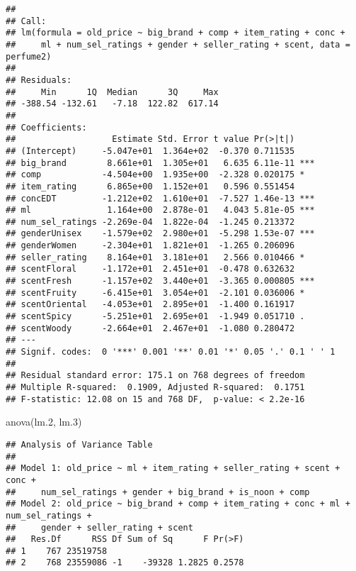 \documentclass[
]{article}
\newenvironment{Shaded}{\begin{snugshade}}{\end{snugshade}}
\newcommand{\FloatTok}[1]{\textcolor[rgb]{0.00,0.00,0.81}{#1}}
\newcommand{\FunctionTok}[1]{\textcolor[rgb]{0.00,0.00,0.00}{#1}}
\newcommand{\NormalTok}[1]{#1}
\begin{document}
\begin{verbatim}
## 
## Call:
## lm(formula = old_price ~ big_brand + comp + item_rating + conc + 
##     ml + num_sel_ratings + gender + seller_rating + scent, data = perfume2)
## 
## Residuals:
##     Min      1Q  Median      3Q     Max 
## -388.54 -132.61   -7.18  122.82  617.14 
## 
## Coefficients:
##                   Estimate Std. Error t value Pr(>|t|)    
## (Intercept)     -5.047e+01  1.364e+02  -0.370 0.711535    
## big_brand        8.661e+01  1.305e+01   6.635 6.11e-11 ***
## comp            -4.504e+00  1.935e+00  -2.328 0.020175 *  
## item_rating      6.865e+00  1.152e+01   0.596 0.551454    
## concEDT         -1.212e+02  1.610e+01  -7.527 1.46e-13 ***
## ml               1.164e+00  2.878e-01   4.043 5.81e-05 ***
## num_sel_ratings -2.269e-04  1.822e-04  -1.245 0.213372    
## genderUnisex    -1.579e+02  2.980e+01  -5.298 1.53e-07 ***
## genderWomen     -2.304e+01  1.821e+01  -1.265 0.206096    
## seller_rating    8.164e+01  3.181e+01   2.566 0.010466 *  
## scentFloral     -1.172e+01  2.451e+01  -0.478 0.632632    
## scentFresh      -1.157e+02  3.440e+01  -3.365 0.000805 ***
## scentFruity     -6.415e+01  3.054e+01  -2.101 0.036006 *  
## scentOriental   -4.053e+01  2.895e+01  -1.400 0.161917    
## scentSpicy      -5.251e+01  2.695e+01  -1.949 0.051710 .  
## scentWoody      -2.664e+01  2.467e+01  -1.080 0.280472    
## ---
## Signif. codes:  0 '***' 0.001 '**' 0.01 '*' 0.05 '.' 0.1 ' ' 1
## 
## Residual standard error: 175.1 on 768 degrees of freedom
## Multiple R-squared:  0.1909, Adjusted R-squared:  0.1751 
## F-statistic: 12.08 on 15 and 768 DF,  p-value: < 2.2e-16
\end{verbatim}

\begin{Shaded}
\begin{Highlighting}[]
\FunctionTok{anova}\NormalTok{(lm}\FloatTok{.2}\NormalTok{, lm}\FloatTok{.3}\NormalTok{)}
\end{Highlighting}
\end{Shaded}

\begin{verbatim}
## Analysis of Variance Table
## 
## Model 1: old_price ~ ml + item_rating + seller_rating + scent + conc + 
##     num_sel_ratings + gender + big_brand + is_noon + comp
## Model 2: old_price ~ big_brand + comp + item_rating + conc + ml + num_sel_ratings + 
##     gender + seller_rating + scent
##   Res.Df      RSS Df Sum of Sq      F Pr(>F)
## 1    767 23519758                           
## 2    768 23559086 -1    -39328 1.2825 0.2578
\end{verbatim}
\end{document}
